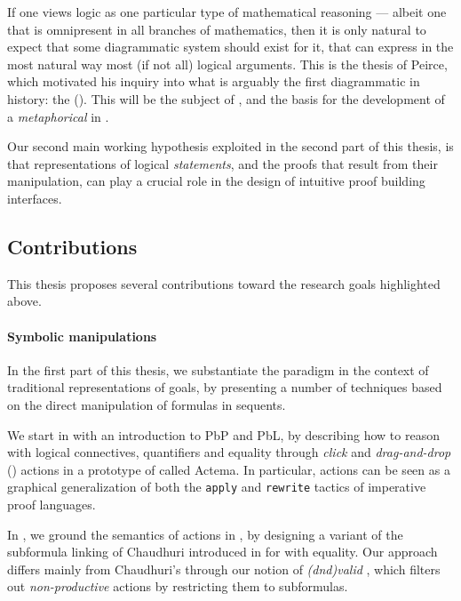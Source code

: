 If one views logic as one particular type of mathematical reasoning --- albeit
one that is omnipresent in all branches of mathematics, then it is only natural
to expect that some diagrammatic system should exist for it, that can express in
the most natural way most (if not all) logical arguments. This is the
\emph{} thesis of Peirce, which motivated his inquiry into what is
arguably the first diagrammatic  in history: the  (). This will be the subject of , and the basis
for the development of a \emph{metaphorical}  in .

\begin{emphpar}
  Our second main working hypothesis exploited in the second part of this
  thesis, is that  representations of logical \emph{statements}, and the
  proofs that result from their manipulation, can play a crucial role in the
  design of intuitive proof building interfaces.
\end{emphpar}

\subsection{Contributions}

This thesis proposes several contributions toward the research goals highlighted
above.

\paragraph{Symbolic manipulations}
  
In the first part of this thesis, we substantiate the  paradigm in the
context of traditional representations of goals, by presenting a number of
techniques based on the direct manipulation of \emph{} formulas in
sequents.

We start in  with an introduction to PbP and PbL, by describing how
to reason with logical connectives, quantifiers and equality through
\emph{click} and \emph{drag-and-drop} () actions in a prototype of
 called Actema. In particular,  actions can be seen as a graphical
generalization of both the \texttt{apply} and \texttt{rewrite} tactics of
imperative proof languages.

In , we ground the semantics of  actions in  , by designing a variant of the subformula linking
 of Chaudhuri introduced in \cite{Chaudhuri2013} for 
 with equality. Our approach differs mainly from Chaudhuri's through our
notion of \emph{\kl(dnd){valid} }, which filters out
\emph{non-productive}  actions by restricting them to
\emph{} subformulas.

